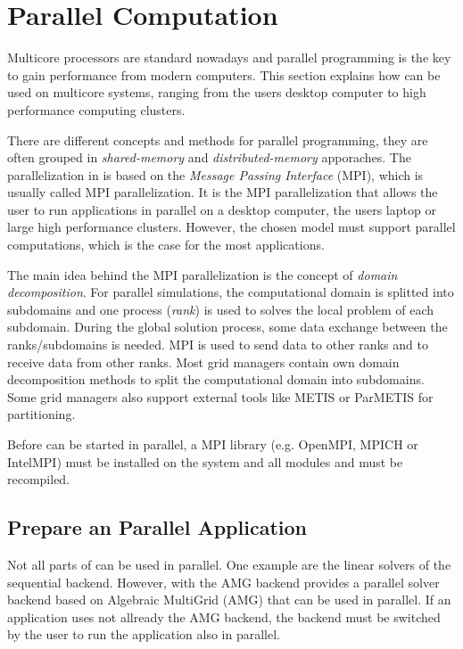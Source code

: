 \section{Parallel Computation}
\label{sec:parallelcomputation}
Multicore processors are standard nowadays and parallel programming is the key to gain
performance from modern computers. This section explains how \Dumux can be used 
on multicore systems, ranging from the users desktop computer to high performance
computing clusters.  

There are different concepts and methods for parallel programming, they are
often grouped in \textit{shared-memory} and \textit{distributed-memory}  
apporaches. The parallelization in \Dumux is based on the 
\textit{Message Passing Interface} (MPI), which is usually called MPI parallelization. 
It is the MPI parallelization that allows the user to run
\Dumux applications in parallel on a desktop computer, the users laptop or 
large high performance clusters. However, the chosen \Dumux 
model must support parallel computations, which is the case for the most \Dumux applications.

The main idea behind the MPI parallelization is the concept of \textit{domain 
decomposition}. For parallel simulations, the computational domain is splitted into 
subdomains and one process (\textit{rank}) is used to solves the local problem of each 
subdomain. During the global solution process, some data exchange between the 
ranks/subdomains is needed. MPI is used to send data to other ranks and to receive 
data from other ranks. 
Most grid managers contain own domain decomposition methods to split the 
computational domain  into subdomains. Some grid managers also support external 
tools like METIS or ParMETIS for partitioning.

Before \Dumux can be started in parallel, a 
MPI library (e.g. OpenMPI, MPICH or IntelMPI) 
must be installed on the system and all \Dune modules and \Dumux must be recompiled.  


\subsection{Prepare an Parallel Application}
Not all parts of \Dumux can be used in parallel. One example are the linear solvers
of the sequential backend. However, with the AMG backend \Dumux provides 
a parallel solver backend based on Algebraic MultiGrid (AMG) that can be used in
parallel. 
If an application uses not allready the AMG backend, the 
backend must be switched by the user to run the application also in parallel.

